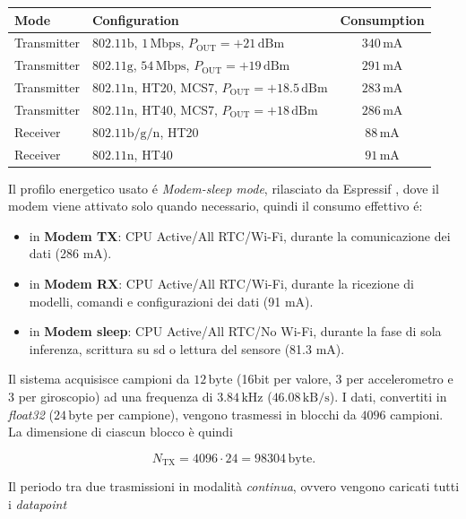 \begin{samepage}
\begin{table}[H]
\begin{tabularx}{\textwidth}{lXc}
		\hline
		\textbf{Mode} & \textbf{Configuration} & \textbf{Consumption} \\
		\hline
		Transmitter & $802.11\text{b}$, $1\,\text{Mbps}$, $P_{\text{OUT}}=+21\,\text{dBm}$ & $340\,\text{mA}$ \\
		Transmitter & $802.11\text{g}$, $54\,\text{Mbps}$, $P_{\text{OUT}}=+19\,\text{dBm}$ & $291\,\text{mA}$ \\
		Transmitter & $802.11\text{n}$, HT20, MCS7, $P_{\text{OUT}}=+18.5\,\text{dBm}$ & $283\,\text{mA}$ \\
		Transmitter & $802.11\text{n}$, HT40, MCS7, $P_{\text{OUT}}=+18\,\text{dBm}$ & $286\,\text{mA}$ \\
		Receiver & $802.11\text{b/g/n}$, HT20 & $88\,\text{mA}$ \\
		Receiver & $802.11\text{n}$, HT40 & $91\,\text{mA}$ \\
		\hline
	\end{tabularx}
\end{table}
\end{samepage}
Il profilo energetico usato é \textit{Modem-sleep mode}, rilasciato da Espressif \cite{esp32s3_datasheet}, dove il modem viene attivato solo quando necessario, quindi il consumo effettivo é:
\begin{itemize}
	\item in \textbf{Modem TX}: CPU Active/All RTC/Wi-Fi, durante la comunicazione dei dati (286 mA).
	\item in \textbf{Modem RX}: CPU Active/All RTC/Wi-Fi, durante la ricezione di modelli, comandi e configurazioni dei dati (91 mA).
	\item in \textbf{Modem sleep}: CPU Active/All RTC/No Wi-Fi, durante la fase di sola inferenza, scrittura su sd o lettura del sensore (81.3 mA).
\end{itemize}

Il sistema acquisisce campioni da \(12\,\mathrm{byte}\) (16bit per valore, 3 per accelerometro e 3 per giroscopio) ad una frequenza di
\(3.84\,\mathrm{kHz}\) (\(46.08\,\mathrm{kB/s}\)). I dati, convertiti in \textit{float32} (\(24\,\mathrm{byte}\) per campione), vengono trasmessi in blocchi da \(4096\) campioni.
La dimensione di ciascun blocco è quindi

\begin{equation}
	N_{\mathrm{TX}} = 4096 \cdot 24 = 98304\,\mathrm{byte}.
\end{equation}

Il periodo tra due trasmissioni in modalità \textit{continua}, ovvero vengono caricati tutti i \textit{datapoint}

